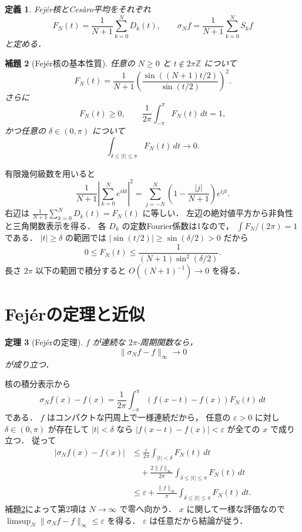 \documentclass[a5paper,10pt,onecolumn]{jsarticle}
\makeatletter
\theoremstyle{mathnotetheorem}
\newtheorem{theorem}{定理}[section]
\newtheorem{definition}[theorem]{定義}
\newtheorem{lemma}[theorem]{補題}
\renewcommand{\proofname}{証明}
\renewenvironment{proof}[1][\proofname]{%
  \par\pushQED{\qed}\normalfont\topsep4\p@\@plus2\p@\relax
  \trivlist\item[\hskip\labelsep\bfseries #1]\ignorespaces
}{\popQED\endtrivlist\@endpefalse}
\newcommand{\norm}[1]{\lVert #1\rVert}
\makeatother
\begin{document}
\begin{definition}
Fej\'er核とCes\`aro平均をそれぞれ
\[
 F_N(t)=\frac1{N+1}\sum_{k=0}^ND_k(t),\qquad
 \sigma_Nf=\frac1{N+1}\sum_{k=0}^NS_kf
\]
と定める．
\end{definition}

\begin{lemma}[Fej\'er核の基本性質]\label{lem:fejer}
任意の $N\ge0$ と $t\notin2\pi\mathbb Z$ について
\[
 F_N(t)=\frac1{N+1}
 \left(\frac{\sin((N+1)t/2)}{\sin(t/2)}\right)^2.
\]
さらに
\[
 F_N(t)\ge0,\qquad
 \frac1{2\pi}\int_{-\pi}^\pi F_N(t)\,dt=1,
\]
かつ任意の $\delta\in(0,\pi)$ について
\[
 \int_{\delta\le|t|\le\pi}F_N(t)\,dt\longrightarrow0.
\]
\end{lemma}
\begin{proof}
有限幾何級数を用いると
\[
 \frac1{N+1}\left|\sum_{k=0}^Ne^{ikt}\right|^2
 =\sum_{j=-N}^N
   \left(1-\frac{|j|}{N+1}\right)e^{ijt}.
\]
右辺は
$\frac1{N+1}\sum_{k=0}^ND_k(t)=F_N(t)$ に等しい．
左辺の絶対値平方から非負性と三角関数表示を得る．
各 $D_k$ の定数Fourier係数は1なので，
$\int F_N/(2\pi)=1$ である．
$|t|\ge\delta$ の範囲では
$|\sin(t/2)|\ge\sin(\delta/2)>0$ だから
\[
 0\le F_N(t)\le
 \frac1{(N+1)\sin^2(\delta/2)}.
\]
長さ $2\pi$ 以下の範囲で積分すると
$O((N+1)^{-1})\to0$ を得る．
\end{proof}

\section{Fej\'erの定理と近似}

\begin{theorem}[Fej\'erの定理]\label{thm:fejer}
$f$ が連続な $2\pi$-周期関数なら，
\[
 \norm{\sigma_Nf-f}_\infty\longrightarrow0
\]
が成り立つ．
\end{theorem}
\begin{proof}
核の積分表示から
\[
 \sigma_Nf(x)-f(x)
 =\frac1{2\pi}\int_{-\pi}^\pi
   (f(x-t)-f(x))F_N(t)\,dt
\]
である．
$f$ はコンパクトな円周上で一様連続だから，
任意の $\varepsilon>0$ に対し
$\delta\in(0,\pi)$ が存在して
$|t|<\delta$ なら
$|f(x-t)-f(x)|<\varepsilon$ が全ての $x$ で成り立つ．
従って
\begin{align*}
 |\sigma_Nf(x)-f(x)|
 &\le\frac{\varepsilon}{2\pi}
      \int_{|t|<\delta}F_N(t)\,dt\\
 &\quad+\frac{2\norm f_\infty}{2\pi}
      \int_{\delta\le|t|\le\pi}F_N(t)\,dt\\
 &\le\varepsilon+
 \frac{\norm f_\infty}{\pi}
      \int_{\delta\le|t|\le\pi}F_N(t)\,dt.
\end{align*}
補題\ref{lem:fejer}によって第2項は $N\to\infty$ で零へ向かう．
$x$ に関して一様な評価なので
$\limsup_N\norm{\sigma_Nf-f}_\infty\le\varepsilon$ を得る．
$\varepsilon$ は任意だから結論が従う．
\end{proof}
\end{document}
